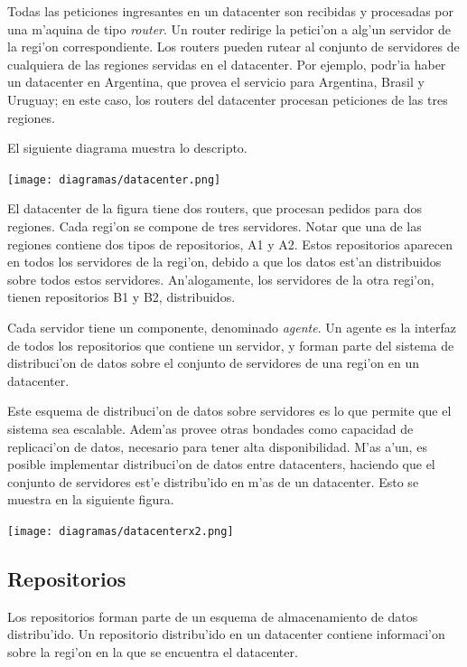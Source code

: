 Todas las peticiones ingresantes en un datacenter son recibidas y procesadas por una m'aquina de tipo \textit{router}. Un router redirige la petici'on a alg'un servidor de la regi'on correspondiente. Los routers pueden rutear al conjunto de servidores de cualquiera de las regiones servidas en el datacenter. Por ejemplo, podr'ia haber un datacenter en Argentina, que provea el servicio para Argentina, Brasil y Uruguay; en este caso, los routers del datacenter procesan peticiones de las tres regiones.

El siguiente diagrama muestra lo descripto.

\texttt{[image: diagramas/datacenter.png]}

\noindent
El datacenter de la figura tiene dos routers, que procesan pedidos para dos regiones. Cada regi'on se compone de tres servidores. Notar que una de las regiones contiene dos tipos de repositorios, A1 y A2. Estos repositorios aparecen en todos los servidores de la regi'on, debido a que los datos est'an distribuidos sobre todos estos servidores. An'alogamente, los servidores de la otra regi'on, tienen repositorios B1 y B2, distribuidos.

Cada servidor tiene un componente, denominado \textit{agente}. Un agente es la interfaz de todos los repositorios que contiene un servidor, y forman parte del sistema de distribuci'on de datos sobre el conjunto de servidores de una regi'on en un datacenter.

Este esquema de distribuci'on de datos sobre servidores es lo que permite que el sistema sea escalable. Adem'as provee otras bondades como capacidad de replicaci'on de datos, necesario para tener alta disponibilidad. M'as a'un, es posible implementar distribuci'on de datos entre datacenters, haciendo que el conjunto de servidores est'e distribu'ido en m'as de un datacenter. Esto se muestra en la siguiente figura.

\texttt{[image: diagramas/datacenterx2.png]}

\subsection{Repositorios}

Los repositorios forman parte de un esquema de almacenamiento de datos distribu'ido. Un repositorio distribu'ido en un datacenter contiene informaci'on sobre la regi'on en la que se encuentra el datacenter.

